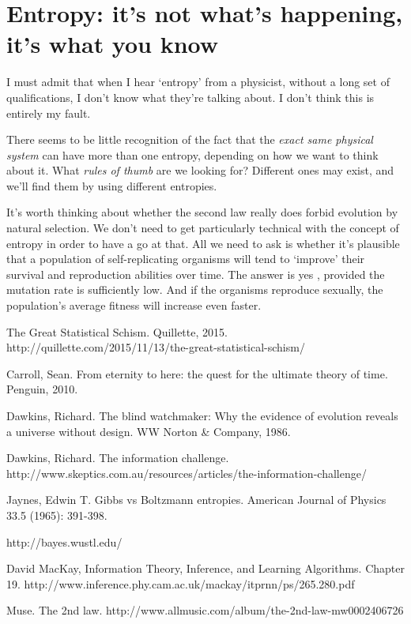 \documentclass[a4paper, 12pt]{article}
\begin{document}
\section*{Entropy: it's not what's happening, it's what you know}



I must admit that when I hear `entropy' from a physicist, without a long
set of qualifications, I don't know what they're talking about.
I don't think this is entirely my fault.

There seems to be little recognition of the fact
that the {\em exact same physical system}
can have more than one entropy, depending on how we want to think about it.
What {\em rules of thumb} are we looking for? Different ones may exist, and
we'll find them by using different entropies.


It's worth thinking about whether the second law really does forbid evolution
by natural selection. We don't need to get particularly technical with the
concept of entropy in order to have a go at that. All we need to ask is whether
it's plausible that a population of self-replicating organisms will tend to
`improve' their survival and reproduction abilities over time.
The answer is yes \citep{mackay}, provided the mutation rate is sufficiently
low. And if the organisms reproduce sexually, the population's average fitness
will increase even faster.


\begin{thebibliography}{999} %
 The Great Statistical Schism. Quillette, 2015.
http://quillette.com/2015/11/13/the-great-statistical-schism/

Carroll, Sean. From eternity to here: the quest for the ultimate theory of time. Penguin, 2010.

Dawkins, Richard. The blind watchmaker: Why the evidence of evolution reveals a universe without design. WW Norton \& Company, 1986.

Dawkins, Richard. The information challenge.
http://www.skeptics.com.au/resources/articles/the-information-challenge/

Jaynes, Edwin T.
Gibbs vs Boltzmann entropies. American Journal of Physics 33.5 (1965): 391-398.

http://bayes.wustl.edu/

David MacKay, Information Theory, Inference, and Learning Algorithms.
Chapter 19.
http://www.inference.phy.cam.ac.uk/mackay/itprnn/ps/265.280.pdf

Muse. The 2nd law.
http://www.allmusic.com/album/the-2nd-law-mw0002406726
\end{thebibliography}
\end{document}

